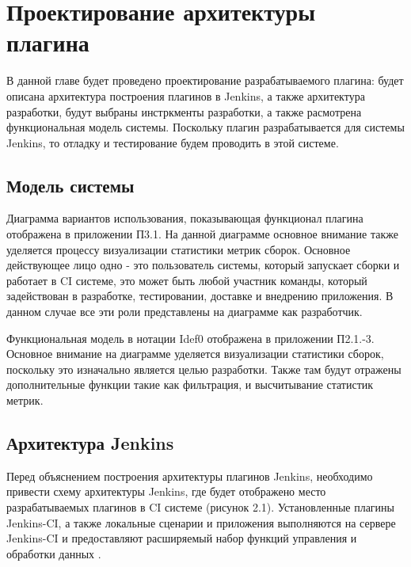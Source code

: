 \chapter{Проектирование архитектуры плагина} \label{ch2}
	
В данной главе будет проведено проектирование разрабатываемого плагина: будет описана архитектура построения плагинов в Jenkins, а также архитектура разработки, будут выбраны инстркменты разработки, а также расмотрена функциональная модель системы. Поскольку плагин разрабатывается для системы Jenkins, то отладку и тестирование будем проводить в этой системе.

\section{Модель системы} \label{ch1:sec1}

Диаграмма вариантов использования, показывающая функционал плагина отображена в приложении П3.1. На данной диаграмме основное внимание также уделяется процессу визуализации статистики метрик сборок. Основное действующее лицо одно - это пользователь системы, который запускает сборки и работает в CI системе, это может быть любой участник команды, который задействован в разработке, тестировании, доставке и внедрению приложения. В данном случае все эти роли представлены на диаграмме как разработчик.

Функциональная модель в нотации Idef0 отображена в приложении П2.1.-3. Основное внимание на диаграмме уделяется визуализации статистики сборок, поскольку это изначально является целью разработки. Также там будут отражены дополнительные функции такие как фильтрация, и высчитывание статистик метрик.

\section{Архитектура Jenkins} \label{ch1:sec2}

Перед объяснением построения архитектуры плагинов Jenkins, необходимо привести схему архитектуры Jenkins, где будет отображено место разрабатываемых плагинов в CI системе (рисунок 2.1). Установленные плагины Jenkins-CI, а также локальные сценарии и приложения выполняются на сервере Jenkins-CI и предоставляют расширяемый набор функций управления и обработки данных \cite{article}.

